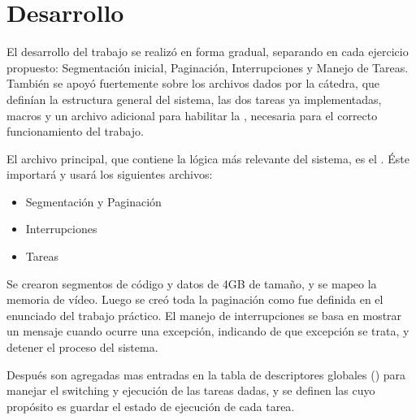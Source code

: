 \section{Desarrollo}

	El desarrollo del trabajo se realizó en forma gradual, separando en cada ejercicio propuesto: Segmentación inicial, Paginación, Interrupciones 
y Manejo de Tareas. También se apoyó fuertemente sobre los archivos dados por la cátedra, que definían la estructura general del sistema, las dos tareas 
ya implementadas, macros y un archivo adicional para habilitar la , necesaria para el correcto funcionamiento del trabajo.

	El archivo principal, que contiene la lógica más relevante del sistema, es el . Éste importará y usará los siguientes archivos:

\begin{itemize}
\item Segmentación y Paginación
\item Interrupciones
\item Tareas
\end{itemize}

	Se crearon segmentos de código y datos de 4GB de tamaño, y se mapeo la memoria de vídeo. Luego se creó toda la paginación como fue definida 
en el enunciado del trabajo práctico. El manejo de interrupciones se basa en mostrar un mensaje cuando ocurre una excepción, indicando de que excepción 
se trata, y detener el proceso del sistema. 

	Después son agregadas mas entradas en la tabla de descriptores globales () para manejar el switching y ejecución de las tareas dadas, y se 
definen las  cuyo propósito es guardar el estado de ejecución de cada tarea. 

\pagebreak
